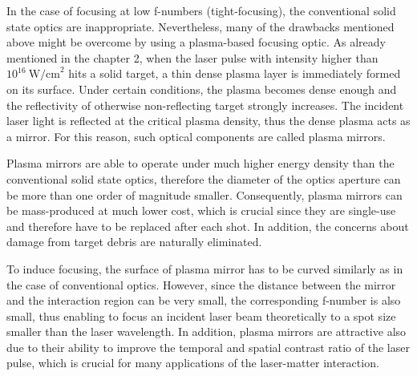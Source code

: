 In the case of focusing at low f-numbers (tight-focusing), the conventional solid state optics are inappropriate. Nevertheless, many of the drawbacks mentioned above might be overcome by using a plasma-based focusing optic. As already mentioned in the chapter 2, when the laser pulse with intensity higher than $ 10^{16} \ \mathrm{W/cm}^{2} $ hits a solid target, a thin dense plasma layer is immediately formed on its surface. Under certain conditions, the plasma becomes dense enough and the reflectivity of otherwise non-reflecting target strongly increases. The incident laser light is reflected at the critical plasma density, thus the dense plasma acts as a mirror. For this reason, such optical components are called plasma mirrors.

Plasma mirrors are able to operate under much higher energy density than the conventional solid state optics, therefore the diameter of the optics aperture can be more than one order of magnitude smaller. Consequently, plasma mirrors can be mass-produced at much lower cost, which is crucial since they are single-use and therefore have to be replaced after each shot. In addition, the concerns about damage from target debris are naturally eliminated.

To induce focusing, the surface of plasma mirror has to be curved similarly as in the case of conventional optics. However, since the distance between the mirror and the interaction region can be very small, the corresponding f-number is also small, thus enabling to focus an incident laser beam theoretically to a spot size smaller than the laser wavelength. In addition, plasma mirrors are attractive also due to their ability to improve the temporal and spatial contrast ratio of the laser pulse, which is crucial for many applications of the laser-matter interaction.

